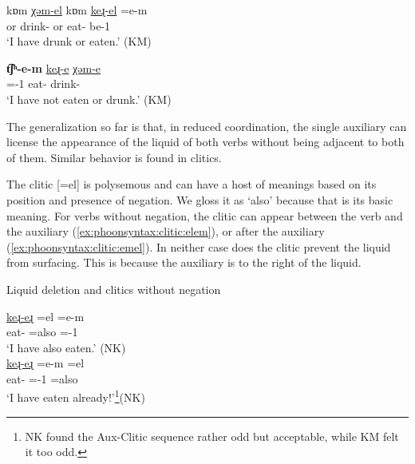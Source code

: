 \begin{exe}
	\ex \label{ex:phonosyntax:coord:reduce:dual}
	\begin{xlist}
		\ex \gll kɒm \uline{χəm-el} kɒm   \uline{keɻ-el} {\colorbox{lsLightGray}{=e-m}}
		\\
		or drink-{\perfcvb} or eat-{\perfcvb} be-1{\sg} 
		\\
		\trans `I have   drunk or eaten.' \label{ex:phonosyntax:coord:reduce:dual:right}\hfill (KM)
		\\
		
		\ex \gll \textbf{t͡ʃʰ\colorbox{lsLightGray}{-e-m}}  \uline{keɻ-e} \uline{χəm-e}
		\\
		{\neggloss}={\auxgloss}-1{\sg} eat-{\perfcvb} drink-{\perfcvb} 
		\\
		\trans `I have not eaten or drunk.'\label{ex:phonosyntax:coord:reduce:dual:left} \hfill (KM)
		\\
\end{xlist}			\end{exe}


The generalization so far is that, in reduced coordination, the single auxiliary can license the appearance of the liquid  of both verbs without being adjacent to both of them. Similar  behavior is found in clitics.  

The clitic [=el] is polysemous and can have a host of meanings based on its position and presence of negation. We gloss it as `also' because that is its basic meaning. For verbs without negation, the clitic can appear between the verb and the auxiliary (\ref{ex:phoonsyntax:clitic:elem}), or after the auxiliary (\ref{ex:phoonsyntax:clitic:emel}). In neither case does the clitic prevent the liquid from surfacing. This is because the auxiliary is to the right of the liquid. 

\begin{exe}
	\ex Liquid deletion and clitics without negation
	\begin{xlist}
		\ex \gll \uline{keɻ-eɻ} =el \colorbox{lsLightGray}{=e-m} \\
		eat-{\perfcvb} =also ={\auxgloss}-1{\sg}\\
		\trans `I have also eaten.'  \label{ex:phoonsyntax:clitic:elem}\hfill (NK)
		\\
		\armenian{Կերեր  էլ եմ։}
		\ex \gll \uline{keɻ-eɻ} \colorbox{lsLightGray}{=e-m} =el \\
		eat-{\perfcvb} ={\auxgloss}-1{\sg} =also\\
		\trans `I have eaten already!'\footnote{NK found the Aux-Clitic sequence rather odd but acceptable, while KM felt it too odd.}\label{ex:phoonsyntax:clitic:emel}\hfill (NK)
		\\
		\armenian{Կերեր եմ էլ։}
		
	\end{xlist}
\end{exe}

